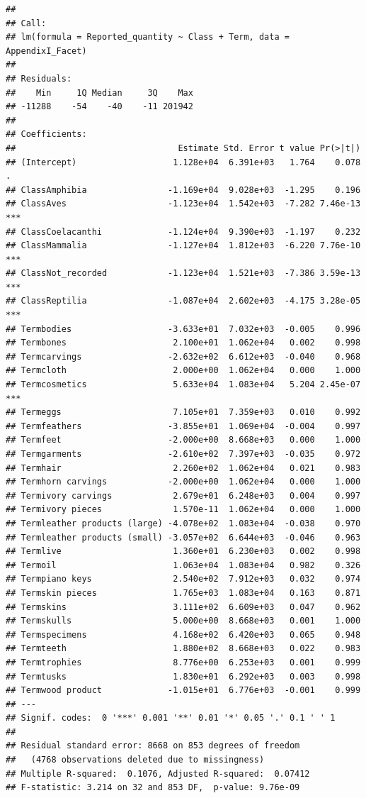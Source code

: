 \documentclass[
  12pt,
]{article}
\begin{document}
\begin{verbatim}
## 
## Call:
## lm(formula = Reported_quantity ~ Class + Term, data = AppendixI_Facet)
## 
## Residuals:
##    Min     1Q Median     3Q    Max 
## -11288    -54    -40    -11 201942 
## 
## Coefficients:
##                                Estimate Std. Error t value Pr(>|t|)    
## (Intercept)                   1.128e+04  6.391e+03   1.764    0.078 .  
## ClassAmphibia                -1.169e+04  9.028e+03  -1.295    0.196    
## ClassAves                    -1.123e+04  1.542e+03  -7.282 7.46e-13 ***
## ClassCoelacanthi             -1.124e+04  9.390e+03  -1.197    0.232    
## ClassMammalia                -1.127e+04  1.812e+03  -6.220 7.76e-10 ***
## ClassNot_recorded            -1.123e+04  1.521e+03  -7.386 3.59e-13 ***
## ClassReptilia                -1.087e+04  2.602e+03  -4.175 3.28e-05 ***
## Termbodies                   -3.633e+01  7.032e+03  -0.005    0.996    
## Termbones                     2.100e+01  1.062e+04   0.002    0.998    
## Termcarvings                 -2.632e+02  6.612e+03  -0.040    0.968    
## Termcloth                     2.000e+00  1.062e+04   0.000    1.000    
## Termcosmetics                 5.633e+04  1.083e+04   5.204 2.45e-07 ***
## Termeggs                      7.105e+01  7.359e+03   0.010    0.992    
## Termfeathers                 -3.855e+01  1.069e+04  -0.004    0.997    
## Termfeet                     -2.000e+00  8.668e+03   0.000    1.000    
## Termgarments                 -2.610e+02  7.397e+03  -0.035    0.972    
## Termhair                      2.260e+02  1.062e+04   0.021    0.983    
## Termhorn carvings            -2.000e+00  1.062e+04   0.000    1.000    
## Termivory carvings            2.679e+01  6.248e+03   0.004    0.997    
## Termivory pieces              1.570e-11  1.062e+04   0.000    1.000    
## Termleather products (large) -4.078e+02  1.083e+04  -0.038    0.970    
## Termleather products (small) -3.057e+02  6.644e+03  -0.046    0.963    
## Termlive                      1.360e+01  6.230e+03   0.002    0.998    
## Termoil                       1.063e+04  1.083e+04   0.982    0.326    
## Termpiano keys                2.540e+02  7.912e+03   0.032    0.974    
## Termskin pieces               1.765e+03  1.083e+04   0.163    0.871    
## Termskins                     3.111e+02  6.609e+03   0.047    0.962    
## Termskulls                    5.000e+00  8.668e+03   0.001    1.000    
## Termspecimens                 4.168e+02  6.420e+03   0.065    0.948    
## Termteeth                     1.880e+02  8.668e+03   0.022    0.983    
## Termtrophies                  8.776e+00  6.253e+03   0.001    0.999    
## Termtusks                     1.830e+01  6.292e+03   0.003    0.998    
## Termwood product             -1.015e+01  6.776e+03  -0.001    0.999    
## ---
## Signif. codes:  0 '***' 0.001 '**' 0.01 '*' 0.05 '.' 0.1 ' ' 1
## 
## Residual standard error: 8668 on 853 degrees of freedom
##   (4768 observations deleted due to missingness)
## Multiple R-squared:  0.1076, Adjusted R-squared:  0.07412 
## F-statistic: 3.214 on 32 and 853 DF,  p-value: 9.76e-09
\end{verbatim}
\end{document}
